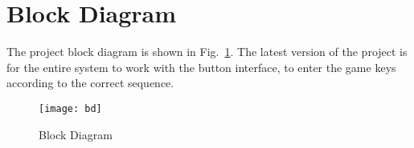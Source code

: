 \section{Block Diagram}

The project block diagram is shown in Fig.~\ref{fig:bd}. The latest version of the project is 
for the entire system to work with the button interface, to enter the game keys according to the correct sequence. 

\begin{figure}[!htbp]
    \centerline{\texttt{[image: bd]}}
    \vspace{0cm}\caption{Block Diagram}
    \label{fig:bd}
\end{figure}
